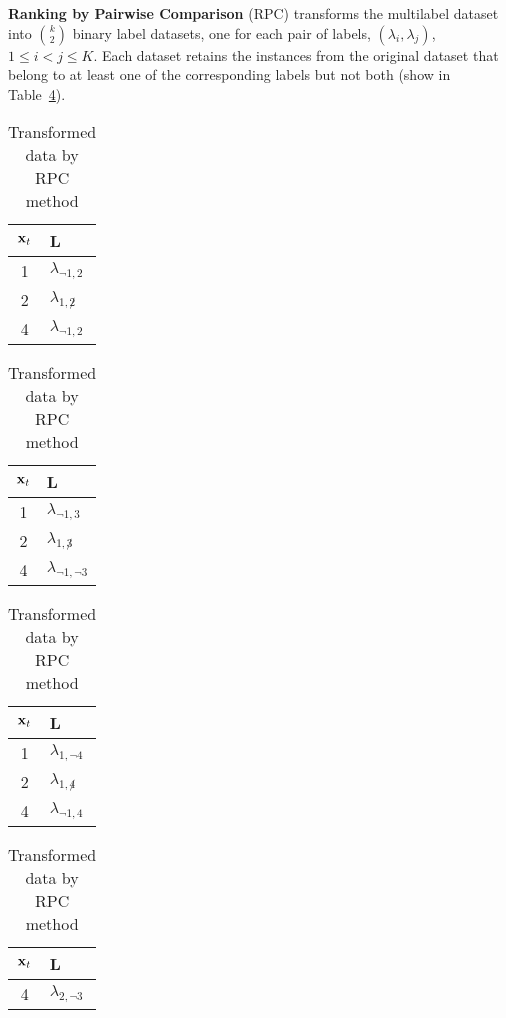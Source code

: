 \textbf{Ranking by Pairwise Comparison} (RPC) \cite{brinker2007label} transforms the multilabel dataset into $\binom{k}{2}$ binary label datasets, one for each pair of labels, $(\lambda_i,\lambda_j)$, $1\leqslant i < j \leqslant K$. Each dataset retains the instances from the original dataset that belong to at least one of the corresponding labels but not both (show in Table~\ref{table:MLRPC}).
\begin{table}[!htb]
\caption{Transformed data by RPC method}
\label{table:MLRPC}
\centering
\begin{subtable}[]{.16\textwidth}
\centering
\begin{tabular}{c|l}
\toprule
$\mathbf{x}_t$ & L \\
\hline
1 & $\lambda_{\lnot1,2}$\\
2 & $\lambda_{1,\not2}$ \\
4 & $\lambda_{\lnot1,2}$\\
\bottomrule
\end{tabular}
\subcaption{}
\end{subtable}
\hfill
\begin{subtable}[]{.16\textwidth}
\centering
\begin{tabular}{c|l}
\toprule
$\mathbf{x}_t$ & L \\
\hline
1 & $\lambda_{\lnot1,3}$\\
2 & $\lambda_{1,\not3}$ \\
4 & $\lambda_{\lnot1,\lnot3}$\\
\bottomrule
\end{tabular}
\subcaption{}
\end{subtable}
\hfill
\begin{subtable}[]{.16\textwidth}
\centering
\begin{tabular}{c|l}
\toprule
$\mathbf{x}_t$ & L \\
\hline
1 & $\lambda_{1,\lnot4}$\\
2 & $\lambda_{1,\not4}$ \\
4 & $\lambda_{\lnot1,4}$\\
\bottomrule
\end{tabular}
\subcaption{}
\end{subtable}
\hfill
\begin{subtable}[]{.16\textwidth}
\centering
\begin{tabular}{c|l}
\toprule
$\mathbf{x}_t$ & L \\
\hline
4 & $\lambda_{2,\lnot3}$\\
\bottomrule
\end{tabular}
\subcaption{}
\end{subtable}

\end{table}
